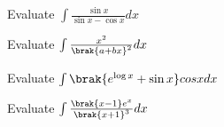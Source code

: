 \iffalse
  \title{Assignment}
  \author{Abhijeet Kumar - ai24btech11001}
  \section{subjective}
\fi
    \item Evaluate $\int \frac{\sin x}{\sin x - \cos x}dx $
\hfill{}
\item Evaluate $\int \frac{x^{2}}{\brak{a+bx}^{2}}dx$
\hfill {}
\item Evaluate $\int \brak{e^{\log x} + \sin x}cos xdx $
\hfill {}
\item Evaluate $\int \frac{\brak{x-1}e^{x}}{\brak{x+1}^{3}} dx$
\hfill {}

